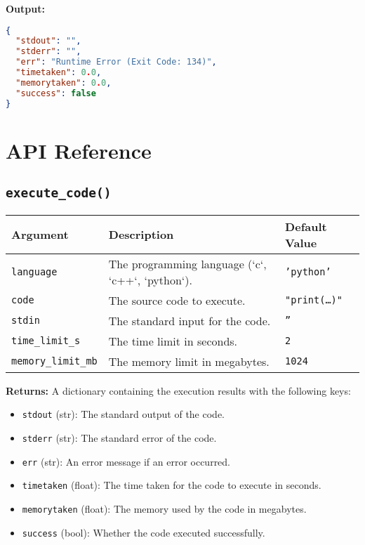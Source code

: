 \documentclass{article}
\begin{document}
\textbf{Output:}
\begin{lstlisting}[language=json]
{
  "stdout": "",
  "stderr": "",
  "err": "Runtime Error (Exit Code: 134)",
  "timetaken": 0.0,
  "memorytaken": 0.0,
  "success": false
}
\end{lstlisting}

\section{API Reference}

\subsection{\texttt{execute\_code()}}
\begin{table}[h!]
    \centering
    \begin{tabularx}{\textwidth}{|l|X|l|}
        \hline
        \textbf{Argument} & \textbf{Description} & \textbf{Default Value} \\
        \hline
        \texttt{language} & The programming language (`c`, `c++`, `python`). & \texttt{'python'} \\
        \hline
        \texttt{code} & The source code to execute. & \texttt{"print(\dots{})"} \\
        \hline
        \texttt{stdin} & The standard input for the code. & \texttt{''} \\
        \hline
        \texttt{time\_limit\_s} & The time limit in seconds. & \texttt{2} \\
        \hline
        \texttt{memory\_limit\_mb} & The memory limit in megabytes. & \texttt{1024} \\
        \hline
    \end{tabularx}
\end{table}

\textbf{Returns:} A dictionary containing the execution results with the following keys:
\begin{itemize}
    \item \texttt{stdout} (str): The standard output of the code.
    \item \texttt{stderr} (str): The standard error of the code.
    \item \texttt{err} (str): An error message if an error occurred.
    \item \texttt{timetaken} (float): The time taken for the code to execute in seconds.
    \item \texttt{memorytaken} (float): The memory used by the code in megabytes.
    \item \texttt{success} (bool): Whether the code executed successfully.
\end{itemize}
\end{document}
